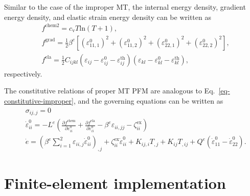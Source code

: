 \documentclass[reprint,3p,sort&compress,times,onecolumn]{elsarticle}
\begin{document}
Similar to the case of the improper MT, the internal energy density, gradient energy density, and elastic strain energy density can be written as
\begin{equation}
\begin{split}
&f^{\text{chem2}} = c_\text{v} T \text{ln}(T+1), \\
&f^{\text{grad}} = \frac{1}{2} \beta^e \left[ \left( \varepsilon_{11,1}^0 \right)^2 +\left( \varepsilon_{11,2}^0 \right)^2 +\left( \varepsilon_{22,1}^0 \right)^2 +\left( \varepsilon_{22,2}^0 \right)^2  \right], \\
&f^{\text{ela}} = \frac{1}{2} C_{ijkl}(\varepsilon_{ij}-\varepsilon_{ij}^0-\varepsilon_{ij}^{\text{th}})(\varepsilon_{kl}-\varepsilon_{kl}^0-\varepsilon_{kl}^{\text{th}}),
\end{split}
\end{equation}
respectively.

The constitutive relations of proper MT PFM are analogous to Eq.~\ref{eq-constitutive-improper}, and the governing equations can be written as
\begin{equation}
\begin{split}
& \sigma_{ij,j}=0     \\
& \dot{\varepsilon}_{ii}^0=-L^e \left(\frac{\partial f^{\text{chem}}}{\partial \varepsilon_{ii}^0} +\frac{\partial f^{\text{ela}}}{\partial\varepsilon_{ii}^0} - \beta^{e} \varepsilon_{ii,jj} - \zeta_{ii}^{\text{ex}}  \right)  \\
& \dot{e} = \left(\beta^{e}\sum_{i=1}^2\varepsilon_{ii,j} \dot{\varepsilon}_{ii}^0 \right)_{,j} + \zeta_{ii}^{\text{ex}} \dot{\varepsilon}_{ii}^0+ K_{ij,i}T_{,j}+K_{ij}T_{,ij} + Q^e(\dot{\varepsilon}_{11}^0-\dot{\varepsilon}_{22}^0). \label{eq-goverming-improper}
\end{split}
\end{equation}


\section{Finite-element implementation}\label{sec3}
\end{document}

